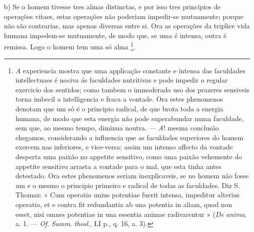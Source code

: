 b) Se o homem tivesse tres almas distinctas, e por isso tres principios de operações vitaes, estas operações não poderiam impedir-se mutuamente; porque não são contrarias, mas apenas diversas entre si. Ora as operações da triplice vida humana impedem-se mutuamente, de modo que, se uma é intensa, outra é remissa. Logo o homem tem uma só alma \footnote{\emph{A} experiencia mostra que uma applicação constante e intensa das faculdades intellectuaes é nociva ás faculdades nutritivas e pode impedir o regular exercicio dos sentidos; como tambem o immoderado uso dos prazeres sensiveis torna imbecil a intelligencia e fraca a vontade. Ora estes phenomenos denotam que um só é o principio radical, de que brota toda a energia humana, de modo que esta energia não pode superabundar numa faculdade, sem que, ao mesmo tempo, diminua noutra. --- \emph{A}! mesma conclusão chegamos, considerando a influencia que as faculdades superiores do homem exercem nas inferiores, e vice-versa; assim um intenso affecto da vontade desperta uma paixão no appetite sensitivo, como uma paixão vehemente do appetite sensitivo arrasta a vontade para o mal, que esta tinha antes detestado. Ora estes phenomenos seriam inexplicaveis, se no homem não fosse um e o mesmo o principio primeiro e radical de todas as faculdades. Diz S. Thomaz: « Cum operatio unius potentiae fuerit intensa, impeditur alterius operatio, et e contra fit redundantia ab una potentia in aliam, quod non esset, nisi omnes potentiae in una essentia animae radivarentur » (\emph{De anima}, a. 1. --- \emph{Of}. \emph{Summ}. \emph{theol}., LI p., q. 16, a. 3).}.

